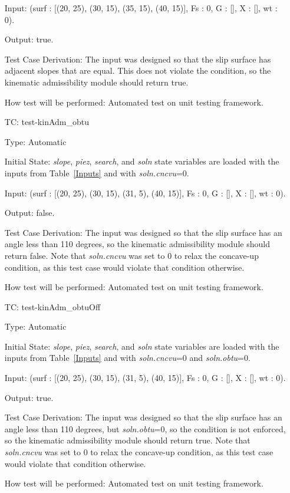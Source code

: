 \documentclass[12pt, titlepage]{article}
\newcounter{utestnum} %
\begin{document}
\begin{enumerate}[label=TC\arabic*:,ref={\arabic*}]
	Input: (surf : [(20, 25), (30, 15), (35, 15), (40, 15)], Fs : 0, G : [], X 
	: [], wt : 0).
	
	Output: true.
	
	Test Case Derivation: The input was designed so that the slip surface has 
	adjacent slopes that are equal. This does not violate the condition, so the 
	kinematic admissibility module should return true.
	
	How test will be performed: Automated test on unit testing framework.
	
	\item [TC\refstepcounter{utestnum}\theutestnum: \label{TC_KinAdmObtu}] 
	test-kinAdm\_obtu
	
	Type: Automatic
	
	Initial State: \textit{slope}, \textit{piez}, \textit{search}, and 
	\textit{soln} state variables are loaded with the inputs from 
	Table~\ref{Inputs} and with \textit{soln.cncvu}=0.
	
	Input: (surf : [(20, 25), (30, 15), (31, 5), (40, 15)], Fs : 0, G : [], X : 
	[], wt : 0).
	
	Output: false.
	
	Test Case Derivation: The input was designed so that the slip surface has 
	an angle less than 110 degrees, so the kinematic admissibility module 
	should return false. Note that \textit{soln.cncvu} was set to 0 to relax 
	the concave-up condition, as this test case would violate that condition 
	otherwise.
	
	How test will be performed: Automated test on unit testing framework.
	
	\item [TC\refstepcounter{utestnum}\theutestnum: \label{TC_KinAdmObtuOff}] 
	test-kinAdm\_obtuOff
	
	Type: Automatic
	
	Initial State: \textit{slope}, \textit{piez}, \textit{search}, and 
	\textit{soln} state variables are loaded with the inputs from 
	Table~\ref{Inputs} and with \textit{soln.cncvu}=0 and \textit{soln.obtu}=0.
	
	Input: (surf : [(20, 25), (30, 15), (31, 5), (40, 15)], Fs : 0, G : [], X : 
	[], wt : 0).
	
	Output: true.
	
	Test Case Derivation: The input was designed so that the slip surface has 
	an angle less than 110 degrees, but \textit{soln.obtu}=0, so the condition 
	is not enforced, so the kinematic admissibility module should return true. 
	Note that \textit{soln.cncvu} was set to 0 to relax the concave-up 
	condition, as this test case would violate that condition otherwise.
	
	How test will be performed: Automated test on unit testing framework.
	
\end{enumerate}
\end{document}
